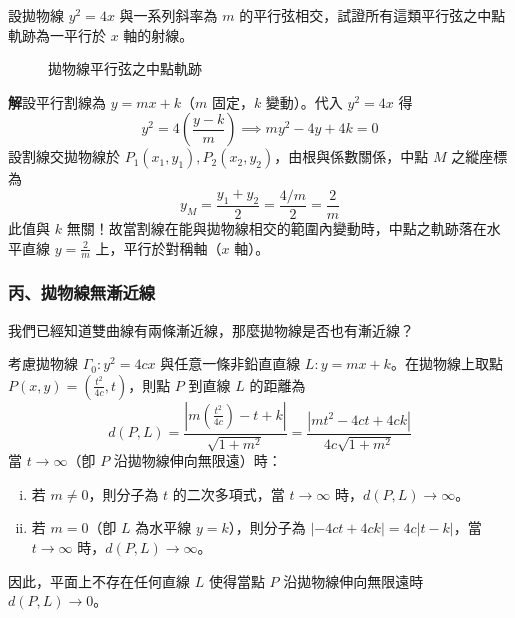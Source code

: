 \begin{example}
設拋物線 $y^2 = 4x$ 與一系列斜率為 $m$ 的平行弦相交，試證所有這類平行弦之中點軌跡為一平行於 $x$ 軸的射線。

\begin{figure}[htbp]
\centering
{}
\caption{拋物線平行弦之中點軌跡}
\label{fig:b4s-3-24}
\end{figure}

\textbf{解}\quad 設平行割線為 $y = mx + k$（$m$ 固定，$k$ 變動）。代入 $y^2 = 4x$ 得
\[ y^2 = 4\left(\frac{y-k}{m}\right) \implies my^2 - 4y + 4k = 0 \]
設割線交拋物線於 $P_1(x_1, y_1), P_2(x_2, y_2)$，由根與係數關係，中點 $M$ 之縱座標為
\[ y_M = \frac{y_1 + y_2}{2} = \frac{4/m}{2} = \frac{2}{m} \]
此值與 $k$ 無關！故當割線在能與拋物線相交的範圍內變動時，中點之軌跡落在水平直線 $y = \frac{2}{m}$ 上，平行於對稱軸（$x$ 軸）。
\end{example}

\subsubsection*{丙、拋物線無漸近線}

我們已經知道雙曲線有兩條漸近線，那麼拋物線是否也有漸近線？

考慮拋物線 $\Gamma_0 : y^2 = 4cx$ 與任意一條非鉛直直線 $L: y = mx + k$。在拋物線上取點 $P(x,y) = (\frac{t^2}{4c}, t)$，則點 $P$ 到直線 $L$ 的距離為
\[ d(P, L) = \frac{\left|m\left(\frac{t^2}{4c}\right) - t + k\right|}{\sqrt{1 + m^2}} = \frac{|mt^2 - 4ct + 4ck|}{4c\sqrt{1 + m^2}} \]
當 $t \to \infty$（卽 $P$ 沿拋物線伸向無限遠）時：
\begin{enumerate}[(i)]
  \item 若 $m \neq 0$，則分子為 $t$ 的二次多項式，當 $t \to \infty$ 時，$d(P, L) \to \infty$。
  \item 若 $m = 0$（卽 $L$ 為水平線 $y = k$），則分子為 $|-4ct + 4ck| = 4c|t - k|$，當 $t \to \infty$ 時，$d(P, L) \to \infty$。
\end{enumerate}
因此，平面上不存在任何直線 $L$ 使得當點 $P$ 沿拋物線伸向無限遠時 $d(P, L) \to 0$。

